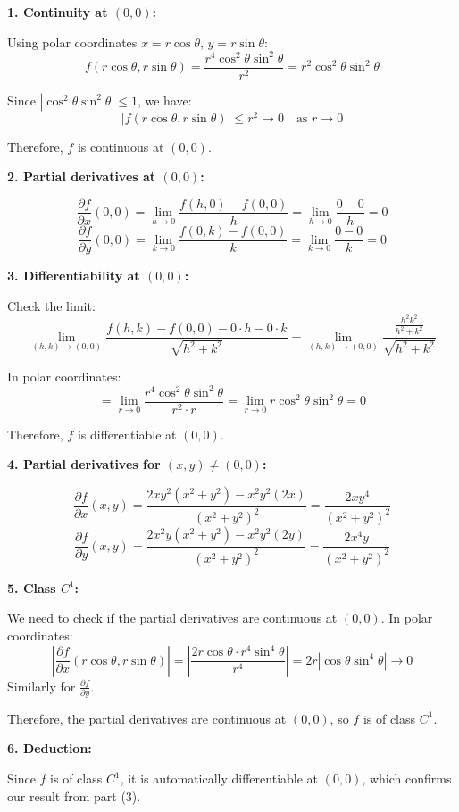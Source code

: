 \documentclass[12pt]{article}
\begin{document}
\begin{correctionbox}
\textbf{1. Continuity at $(0,0)$:}

Using polar coordinates $x = r\cos\theta$, $y = r\sin\theta$:
$$f(r\cos\theta, r\sin\theta) = \frac{r^4\cos^2\theta\sin^2\theta}{r^2} = r^2\cos^2\theta\sin^2\theta$$

Since $|\cos^2\theta\sin^2\theta| \leq 1$, we have:
$$|f(r\cos\theta, r\sin\theta)| \leq r^2 \to 0 \quad \text{as } r \to 0$$

Therefore, $f$ is continuous at $(0,0)$.

\textbf{2. Partial derivatives at $(0,0)$:}

$$\frac{\partial f}{\partial x}(0,0) = \lim_{h\to 0} \frac{f(h,0) - f(0,0)}{h} = \lim_{h\to 0} \frac{0 - 0}{h} = 0$$
$$\frac{\partial f}{\partial y}(0,0) = \lim_{k\to 0} \frac{f(0,k) - f(0,0)}{k} = \lim_{k\to 0} \frac{0 - 0}{k} = 0$$

\textbf{3. Differentiability at $(0,0)$:}

Check the limit:
$$\lim_{(h,k)\to(0,0)} \frac{f(h,k) - f(0,0) - 0\cdot h - 0\cdot k}{\sqrt{h^2 + k^2}} = \lim_{(h,k)\to(0,0)} \frac{\frac{h^2k^2}{h^2 + k^2}}{\sqrt{h^2 + k^2}}$$

In polar coordinates:
$$= \lim_{r\to 0} \frac{r^4\cos^2\theta\sin^2\theta}{r^2 \cdot r} = \lim_{r\to 0} r\cos^2\theta\sin^2\theta = 0$$

Therefore, $f$ is differentiable at $(0,0)$.

\textbf{4. Partial derivatives for $(x,y) \neq (0,0)$:}

$$\frac{\partial f}{\partial x}(x,y) = \frac{2xy^2(x^2 + y^2) - x^2y^2(2x)}{(x^2 + y^2)^2} = \frac{2xy^4}{(x^2 + y^2)^2}$$
$$\frac{\partial f}{\partial y}(x,y) = \frac{2x^2y(x^2 + y^2) - x^2y^2(2y)}{(x^2 + y^2)^2} = \frac{2x^4y}{(x^2 + y^2)^2}$$

\textbf{5. Class $C^1$:}

We need to check if the partial derivatives are continuous at $(0,0)$. In polar coordinates:
$$\left|\frac{\partial f}{\partial x}(r\cos\theta, r\sin\theta)\right| = \left|\frac{2r\cos\theta \cdot r^4\sin^4\theta}{r^4}\right| = 2r|\cos\theta\sin^4\theta| \to 0$$
Similarly for $\frac{\partial f}{\partial y}$.

Therefore, the partial derivatives are continuous at $(0,0)$, so $f$ is of class $C^1$.

\textbf{6. Deduction:}

Since $f$ is of class $C^1$, it is automatically differentiable at $(0,0)$, which confirms our result from part (3).
\end{correctionbox}
\end{document}
